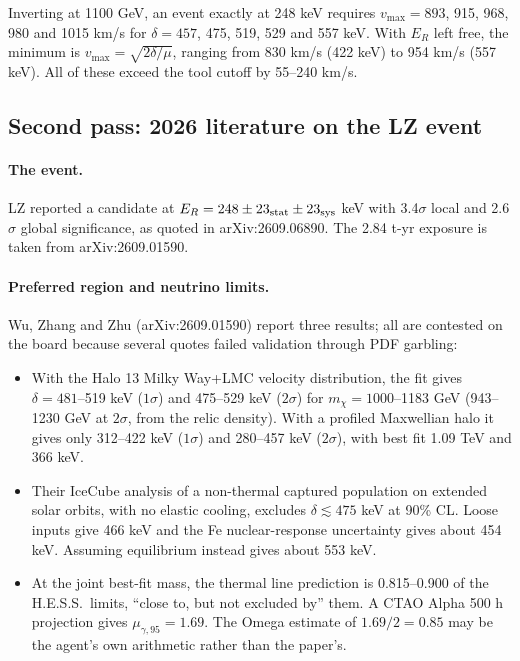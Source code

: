 \documentclass[11pt,a4paper]{article}
\begin{document}
Inverting at 1100 GeV, an event exactly at 248 keV requires $v_{\max}=893$, 915, 968, 980 and 1015 km/s for $\delta=457$, 475, 519, 529 and 557 keV. With $E_R$ left free, the minimum is $v_{\max}=\sqrt{2\delta/\mu}$, ranging from 830 km/s (422 keV) to 954 km/s (557 keV). All of these exceed the tool cutoff by 55--240 km/s.

\subsection{Second pass: 2026 literature on the LZ event}

\paragraph{The event.} LZ reported a candidate at $E_R=248\pm23_{\rm stat}\pm23_{\rm sys}$ keV with 3.4$\sigma$ local and 2.6$\sigma$ global significance, as quoted in arXiv:2609.06890. The 2.84 t-yr exposure is taken from arXiv:2609.01590.

\paragraph{Preferred region and neutrino limits.} Wu, Zhang and Zhu (arXiv:2609.01590) report three results; all are contested on the board because several quotes failed validation through PDF garbling:
\begin{itemize}
\item With the Halo 13 Milky Way+LMC velocity distribution, the fit gives $\delta=481$--519 keV ($1\sigma$) and 475--529 keV ($2\sigma$) for $m_\chi=1000$--1183 GeV (943--1230 GeV at $2\sigma$, from the relic density). With a profiled Maxwellian halo it gives only 312--422 keV ($1\sigma$) and 280--457 keV ($2\sigma$), with best fit 1.09 TeV and 366 keV.
\item Their IceCube analysis of a non-thermal captured population on extended solar orbits, with no elastic cooling, excludes $\delta\lesssim475$ keV at 90\% CL. Loose inputs give 466 keV and the Fe nuclear-response uncertainty gives about 454 keV. Assuming equilibrium instead gives about 553 keV.
\item At the joint best-fit mass, the thermal line prediction is 0.815--0.900 of the H.E.S.S.\ limits, ``close to, but not excluded by'' them. A CTAO Alpha 500 h projection gives $\mu_{\gamma,95}=1.69$. The Omega estimate of $1.69/2=0.85$ may be the agent's own arithmetic rather than the paper's.
\end{itemize}
\end{document}
